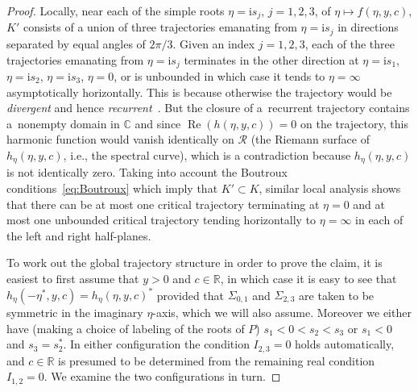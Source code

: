 \documentclass[pdftex]{sigma}
\numberwithin{equation}{section}
\begin{document}
\begin{proof}
Locally, near each of the simple roots $\eta=\mathrm{i} s_j$, $j=1,2,3$, of $\eta\mapsto f(\eta,y,c)$, $K'$ consists of a union of three trajectories emanating from $\eta=\mathrm{i} s_j$ in directions separated by equal angles of $2\pi/3$. Given an index $j=1,2,3$, each of the three trajectories emanating from $\eta=\mathrm{i} s_j$ terminates in the other direction at $\eta=\mathrm{i} s_1$, $\eta=\mathrm{i} s_2$, $\eta=\mathrm{i} s_3$, $\eta=0$, or is unbounded in which case it tends to $\eta=\infty$ asymptotically horizontally. This is because otherwise the trajectory would be \emph{divergent} and hence \emph{recurrent}~\cite[Theorem 11.1]{Strebel84}. But the closure of a~recurrent trajectory contains a~nonempty domain in $\mathbb{C}$ and since $\operatorname{Re}(h(\eta,y,c))=0$ on the trajectory, this harmonic function would vanish identically on $\mathcal{R}$ (the Riemann surface of $h_\eta(\eta,y,c)$, i.e., the spectral curve), which is a contradiction because $h_\eta(\eta,y,c)$ is not identically zero. Taking into account the Boutroux conditions~\eqref{eq:Boutroux} which imply that $K'\subset K$, similar local analysis shows that there can be at most one critical trajectory terminating at $\eta=0$ and at most one unbounded critical trajectory tending horizontally to $\eta=\infty$ in each of the left and right half-planes.

To work out the global trajectory structure in order to prove the claim, it is easiest to first assume that $y>0$ and $c\in\mathbb{R}$, in which case it is easy to see that $h_\eta(-\eta^*,y,c)=h_\eta(\eta,y,c)^*$ provided that $\Sigma_{0,1}$ and $\Sigma_{2,3}$ are taken to be symmetric in the imaginary $\eta$-axis, which we will also assume. Moreover we either have (making a choice of labeling of the roots of $P$) $s_1<0<s_2<s_3$ or $s_1<0$ and $s_3=s_2^*$. In either configuration the condition $I_{2,3}=0$ holds automatically, and $c\in\mathbb{R}$ is presumed to be determined from the remaining real condition $I_{1,2}=0$. We examine the two configurations in turn.


\end{proof}
\end{document}
